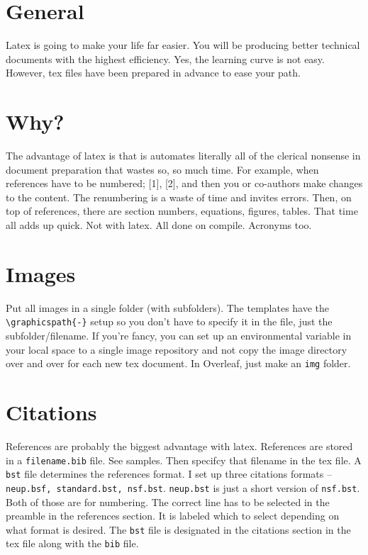 \documentclass[11pt,a4paper]{article}
\begin{document}
\section{General}
Latex is going to make your life far easier. You will be producing better technical documents with the highest efficiency. Yes, the learning curve is not easy. However, tex files have been prepared in advance to ease your path. 


\section{Why?}
The advantage of latex is that is automates literally all of the clerical nonsense in document preparation that wastes so, so much time. For example, when references have to be numbered; [1], [2], and then you or co-authors make changes to the content. The renumbering is a waste of time and invites errors. Then, on top of references, there are section numbers, equations, figures, tables. That time all adds up quick. Not with latex. All done on compile. Acronyms too. 


\section{Images}
Put all images in a single folder (with subfolders). The templates have the \verb=\graphicspath{-}= setup so you don't have to specify it in the file, just the subfolder/filename. If you're fancy, you can set up an environmental variable in your local space to a single image repository and not copy the image directory over and over for each new tex document. In Overleaf, just make an \verb=img= folder.

\section{Citations}
References are probably the biggest advantage with latex. References are stored in a \verb=filename.bib= file. See samples. Then specifcy that filename in the tex file. A \verb=bst= file determines the references format. I set up three citations formats -- \verb=neup.bsf, standard.bst, nsf.bst=. \verb=neup.bst= is just a short version of \verb=nsf.bst=. Both of those are for numbering. The correct line has to be selected in the preamble in the references section. It is labeled which to select depending on what format is desired. The \verb=bst= file is designated in the citations section in the tex file along with the \verb=bib= file. 
\end{document}
